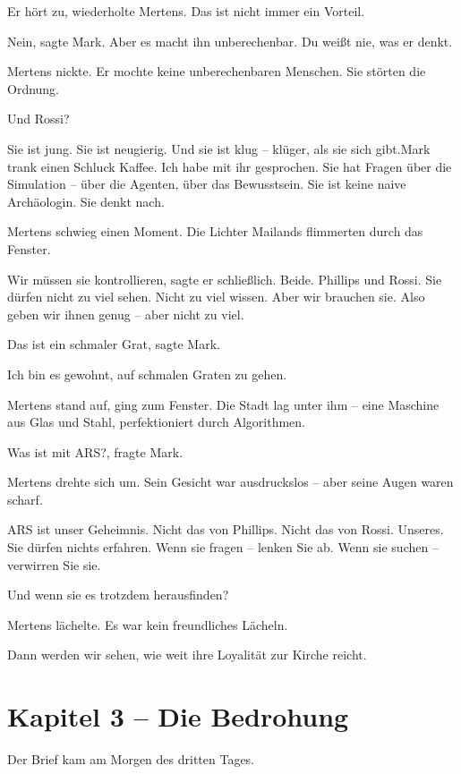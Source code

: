 \documentclass[
]{article}
\begin{document}
\glqq Er hört zu\grqq, wiederholte Mertens. \glqq Das ist nicht immer ein Vorteil.\grqq

\glqq Nein\grqq, sagte Mark. \glqq Aber es macht ihn unberechenbar. Du weißt nie, was er denkt.\grqq

Mertens nickte. Er mochte keine unberechenbaren Menschen. Sie störten die Ordnung.

\glqq Und Rossi?\grqq

\glqq Sie ist jung. Sie ist neugierig. Und sie ist klug -- klüger, als sie sich gibt.\grqq Mark trank einen Schluck Kaffee. \glqq Ich habe mit ihr gesprochen. Sie hat Fragen über die Simulation -- über die Agenten, über das Bewusstsein. Sie ist keine naive Archäologin. Sie denkt nach.\grqq

Mertens schwieg einen Moment. Die Lichter Mailands flimmerten durch das Fenster.

\glqq Wir müssen sie kontrollieren\grqq, sagte er schließlich. \glqq Beide. Phillips und Rossi. Sie dürfen nicht zu viel sehen. Nicht zu viel wissen. Aber wir brauchen sie. Also geben wir ihnen genug -- aber nicht zu viel.\grqq

\glqq Das ist ein schmaler Grat\grqq, sagte Mark.

\glqq Ich bin es gewohnt, auf schmalen Graten zu gehen.\grqq

Mertens stand auf, ging zum Fenster. Die Stadt lag unter ihm -- eine Maschine aus Glas und Stahl, perfektioniert durch Algorithmen.

\glqq Was ist mit ARS?\grqq, fragte Mark.

Mertens drehte sich um. Sein Gesicht war ausdruckslos -- aber seine Augen waren scharf.

\glqq ARS ist unser Geheimnis. Nicht das von Phillips. Nicht das von Rossi. Unseres. Sie dürfen nichts erfahren. Wenn sie fragen -- lenken Sie ab. Wenn sie suchen -- verwirren Sie sie.\grqq

\glqq Und wenn sie es trotzdem herausfinden?\grqq

Mertens lächelte. Es war kein freundliches Lächeln.

\glqq Dann werden wir sehen, wie weit ihre Loyalität zur Kirche reicht.\grqq

\newpage

\section{Kapitel 3 -- Die Bedrohung}

Der Brief kam am Morgen des dritten Tages.
\end{document}
